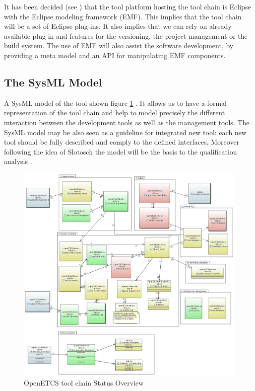 It has been decided (see \cite{D7.1}) that the tool platform hosting
the tool chain is Eclipse with the Eclipse modeling framework
(\gls{EMF}).  This implies that the tool chain will be a set of
Eclipse plug-ins. It also implies that we can rely on already
available plug-in and features for the versioning, the project
management or the build system.  The use of EMF will also assist the
software development, by providing a meta model and an \gls{API} for
manipulating EMF components.


\subsection{The SysML Model}
A SysML model of the tool shown figure \ref{fig:overview} . It
allows us to have a formal representation of the tool chain and
help to model precisely the different interaction between the
development tools as well as the management tools.  The SysML model
may be also seen as a guideline for integrated new tool: each new tool
should be fully described and comply to the defined interfaces.
Moreover following the idea of Slotosch \cite{slotosch_iso_2012} the
model will be the basis to the qualification analysis \cite{D7.3}.

\begin{figure}[htbp]
\includegraphics[width= \textwidth]{images/ToolChainmodel.png}
\caption{\label{fig:overview}OpenETCS tool chain Status Overview}
\end{figure}

